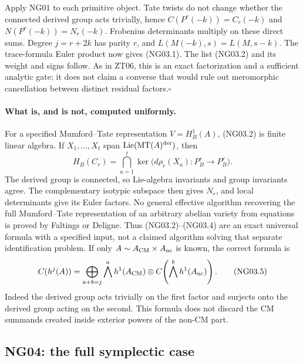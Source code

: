 Apply NG01 to each primitive object.  Tate twists do not change
whether the connected derived group acts trivially, hence
$C(P^r(-k))=C_r(-k)$ and $N(P^r(-k))=N_r(-k)$.  Frobenius determinants
multiply on these direct sums.  Degree $j=r+2k$ has parity $r$, and
$L(M(-k),s)=L(M,s-k)$.  The trace-formula Euler product now gives
(NG03.1).  The list (NG03.2) and its weight and signs follow.  As in
ZT06, this is an exact factorization and a sufficient analytic gate;
it does not claim a converse that would rule out meromorphic
cancellation between distinct residual factors.\hfill$\square$

\paragraph{What is, and is not, computed uniformly.}
For a specified Mumford--Tate representation $V=H^1_B(A)$, (NG03.2)
is finite linear algebra.  If $X_1,\ldots,X_t$ span
$\operatorname{Lie}(\operatorname{MT}(A)^{\rm der})$, then
\[
             H_B(C_r)=\bigcap_{a=1}^t
                  \ker\bigl(d\rho_r(X_a):P^r_B\to P^r_B\bigr).
                                                                    \tag{NG03.4}
\]
The derived group is connected, so Lie-algebra invariants and group
invariants agree.  The complementary isotypic subspace then gives
$N_r$, and local determinants give its Euler factors.  No general
effective algorithm recovering the full Mumford--Tate representation
of an arbitrary abelian variety from equations is proved by
Faltings or Deligne.  Thus (NG03.2)--(NG03.4) are an exact universal
formula with a specified input, not a claimed algorithm solving that
separate identification problem.  If only $A\sim A_{\rm CM}\times
A_{\rm nc}$ is known, the correct formula is
\[
 C(h^j(A))=
 \bigoplus_{a+b=j}\bigwedge^a h^1(A_{\rm CM})\otimes
                       C\!\left(\bigwedge^b h^1(A_{\rm nc})\right).
                                                                    \tag{NG03.5}
\]
Indeed the derived group acts trivially on the first factor and
surjects onto the derived group acting on the second.  This formula
does not discard the CM summands created inside exterior powers of
the non-CM part.

\subsection{NG04: the full symplectic case}
\label{NG04}

